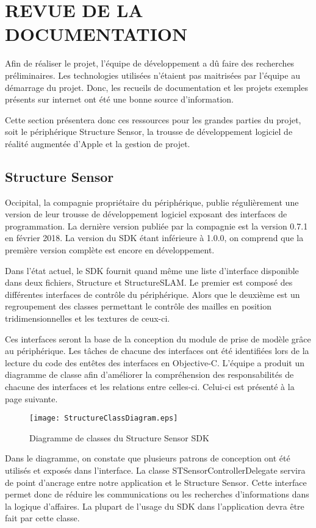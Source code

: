 \documentclass[rapport.tex]{subfiles}
\begin{document}
\chapter*{\uppercase{Revue de la documentation}}
Afin de réaliser le projet, l’équipe de développement a dû faire des recherches préliminaires. Les technologies utilisées n’étaient pas maitrisées par l’équipe au démarrage du projet. Donc, les recueils de documentation et les projets exemples présents sur internet ont été une bonne source d’information.
\par
Cette section présentera donc ces ressources pour les grandes parties du projet, soit le périphérique Structure Sensor, la trousse de développement logiciel de réalité augmentée d'Apple et la gestion de projet.
\section*{Structure Sensor}
Occipital, la compagnie propriétaire du périphérique, publie régulièrement une version de leur trousse de développement logiciel exposant des interfaces de programmation. La dernière version publiée par la compagnie est la version 0.7.1 en février 2018. \citep*{occipitalsdk} La version du SDK étant inférieure à 1.0.0, on comprend que la première version complète est encore en développement.
\par
Dans l’état actuel, le SDK fournit quand même une liste d’interface disponible dans deux fichiers, Structure et StructureSLAM. Le premier est composé des différentes interfaces de contrôle du périphérique. Alors que le deuxième est un regroupement des classes permettant le contrôle des mailles en position tridimensionnelles et les textures de ceux-ci.
\par
Ces interfaces seront la base de la conception du module de prise de modèle grâce au périphérique. Les tâches de chacune des interfaces ont été identifiées lors de la lecture du code des entêtes des interfaces en Objective-C. L’équipe a produit un diagramme de classe afin d’améliorer la compréhension des responsabilités de chacune des interfaces et les relations entre celles-ci. Celui-ci est présenté à la page suivante.
\begin{figure}[H]
    \texttt{[image: StructureClassDiagram.eps]}
\centering
    \caption{Diagramme de classes du Structure Sensor SDK}
\end{figure}
Dans le diagramme, on constate que plusieurs patrons de conception ont été utilisés et exposés dans l’interface. La classe STSensorControllerDelegate servira de point d’ancrage entre notre application et le Structure Sensor. Cette interface permet donc de réduire les communications ou les recherches d’informations dans la logique d’affaires. La plupart de l’usage du SDK dans l’application devra être fait par cette classe.\citep*{bpse01} 
\end{document}
